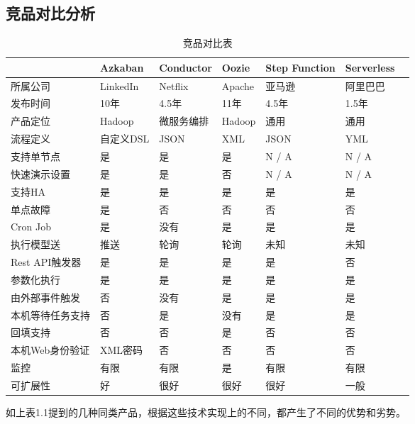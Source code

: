 \subsection{竞品对比分析}

\begin{table}[H]
\centering
\caption{竞品对比表}
\label{tab:compare-1}
\begin{tabular}{lllllll}
\toprule
&Azkaban	&Conductor	&Oozie	&Step Function	&Serverless \\
\midrule
所属公司& LinkedIn& Netflix& Apache& 亚马逊& 阿里巴巴 \\
发布时间&	10年&	4.5年&	11年&	4.5年&	1.5年 \\
产品定位&	Hadoop&	微服务编排&	Hadoop&	通用&	通用 \\
流程定义&	自定义DSL&	JSON&	XML&	JSON&	YML \\
支持单节点&	是&	是&	是&	N / A&	N / A \\
快速演示设置&	是&	是&	否&	N / A&	N / A \\
支持HA&	是&	是&	是&	是&	是 \\
单点故障&	是&	否&	否&	否&	否 \\
Cron Job&	是&	没有&	是&	是&	是 \\
执行模型送&	推送&	轮询&	轮询&	未知&	未知 \\
Rest API触发器&	是&	是&	是&	是&	否 \\
参数化执行&	是&	是&	是&	是&	是 \\
由外部事件触发&	否&	没有&	是&	是&	是 \\
本机等待任务支持&	否&	是&	没有&	是&	是 \\
回填支持&	否&	否&	是&	否&	否 \\
本机Web身份验证&	XML密码&	否&	否&	否&	否 \\
监控&	有限&	有限&	是&	有限&	有限 \\
可扩展性&	好&	很好&	很好&	很好&	一般\\
\bottomrule
\end{tabular}
\end{table}

如上表1.1提到的几种同类产品，根据这些技术实现上的不同，都产生了不同的优势和劣势。


